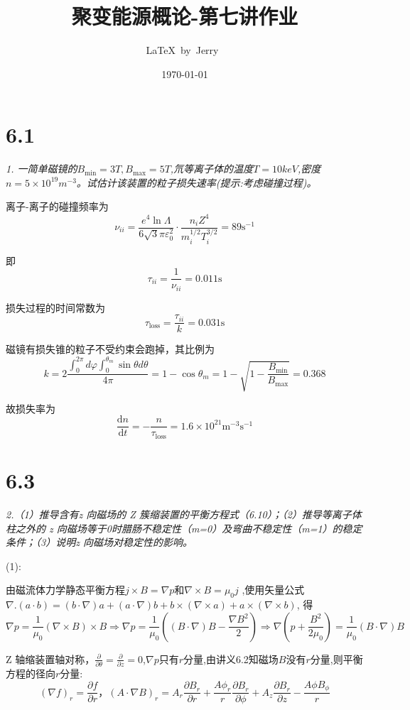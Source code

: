 \documentclass{article}
\title{聚变能源概论-第七讲作业}
\author{\LaTeX\ by\ Jerry\ }
\date{\today}
\begin{document}
\pagestyle{fancy}

\fancyhead[R]{\today}

\section*{6.1}

\emph{1. 一简单磁镜的$B_{\min}=3T,B_{\max}=5T$,氘等离子体的温度$T=10keV$,密度$n=5\times10^{19}m^{-3}$。试估计该装置的粒子损失速率(提示:考虑碰撞过程)。}

离子-离子的碰撞频率为$$\nu_{ii} = \frac{e^4 \ln{\Lambda}}{6\sqrt{3}\pi\varepsilon_0^2} \cdot \frac{n_i Z^4}{m_i^{1/2} T_i^{3/2}} = 89 \text{s}^{-1}$$

即 $$\tau_{ii} = \frac{1}{\nu_{ii}} = 0.011 \text{s}$$

损失过程的时间常数为$$\tau_{\text{loss}} = \frac{\tau_{ii}}{k} = 0.031 \text{s}$$

磁镜有损失锥的粒子不受约束会跑掉，其比例为$$k = 2 \frac{\int_{0}^{2\pi} d\varphi \int_{0}^{\theta_m} \sin \theta d\theta}{4\pi} = 1 - \cos \theta_m = 1 - \sqrt{1 - \frac{B_{\text{min}}}{B_{\text{max}}}} = 0.368$$

故损失率为$$\frac{\text{d}n}{\text{d}t} = -\frac{n}{\tau_{\text{loss}}} = 1.6 \times 10^{21} \text{m}^{-3}\text{s}^{-1}$$

\section*{6.3}

\emph{2.（1）推导含有z 向磁场的 Z 簇缩装置的平衡方程式（6.10）；（2）推导等离子体柱之外的 z 向磁场等于0时腊肠不稳定性（m=0）及弯曲不稳定性（m=1）的稳定条件；（3）说明z 向磁场对稳定性的影响。}

(1):

由磁流体力学静态平衡方程$ j \times B= \nabla p $和$\nabla \times B= \mu_0 j$ ,使用矢量公式$\nabla.(a\cdot b)=(b\cdot\nabla)a+(a\cdot\nabla)b+b\times(\nabla\times a)+a\times(\nabla\times b)$, 得$$\nabla p=\frac{1}{\mu_0}(\nabla\times B)\times B \Rightarrow \nabla p=\frac{1}{\mu_0}\left((B\cdot \nabla)B-\frac{\nabla B^2}{2}\right) \Rightarrow \nabla\left(p+\frac{B^2}{2\mu_0}\right)=\frac{1}{\mu_0}(B\cdot \nabla)B$$

Z 轴缩装置轴对称，$\frac{\partial}{\partial\theta}=\frac{\partial}{\partial z}=0$,$\nabla p$只有$r$分量,由讲义6.2知磁场$B$没有$r$分量,则平衡方程的径向$r$分量: $$(\nabla f)_r=\frac{\partial f}{\partial r}，(A\cdot \nabla B)_r=A_r\frac{\partial B_r}{\partial r}+\frac{A\phi_r}{r}\frac{\partial B_r}{\partial \phi}+A_z\frac{\partial B_r}{\partial z}-\frac{A\phi B_\phi}{r}$$
\end{document}
